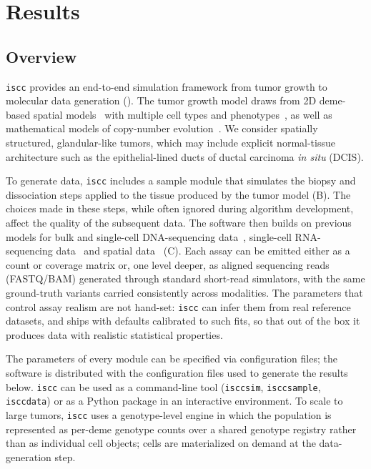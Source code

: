 \documentclass{article}
\begin{document}
\section{Results}
\label{sec:results}

\subsection{Overview}
\label{sec:overview}
\texttt{iscc} provides an end-to-end simulation framework from tumor growth to molecular data
generation (). The tumor growth model draws from 2D deme-based spatial
models~\cite{noble_spatial_2022} with multiple cell types and phenotypes~\cite{gatenbee_macrophage-mediated_2019},
as well as mathematical models of copy-number evolution~\cite{dinh_cinner_2025}. We consider
spatially structured, glandular-like tumors, which may include explicit normal-tissue
architecture such as the epithelial-lined ducts of ductal carcinoma \textit{in situ} (DCIS).

To generate data, \texttt{iscc} includes a sample module that simulates the biopsy and
dissociation steps applied to the tissue produced by the tumor model (B).
The choices made in these steps, while often ignored during algorithm development, affect the
quality of the subsequent data. The software then builds on previous models for bulk and
single-cell DNA-sequencing data~\cite{valecha_somatic_2022, posada_cellcoal_2020}, single-cell
RNA-sequencing data~\cite{zappia_splatter_2017, sun_scdesign2_2021} and spatial
data~\cite{zhu_srtsim_2023, andersson_almaangrowmeatissue_2024} (C). Each
assay can be emitted either as a count or coverage matrix or, one level deeper, as aligned
sequencing reads (FASTQ/BAM) generated through standard short-read simulators, with the same
ground-truth variants carried consistently across modalities. The parameters that control assay
realism are not hand-set: \texttt{iscc} can infer them from real reference datasets, and ships
with defaults calibrated to such fits, so that out of the box it produces data with realistic
statistical properties.

The parameters of every module can be specified via configuration files; the software is
distributed with the configuration files used to generate the results below. \texttt{iscc} can
be used as a command-line tool (\texttt{isccsim}, \texttt{isccsample}, \texttt{isccdata}) or as
a Python package in an interactive environment. To scale to large tumors, \texttt{iscc} uses a
genotype-level engine in which the population is represented as per-deme genotype counts over a
shared genotype registry rather than as individual cell objects; cells are materialized on
demand at the data-generation step.
\end{document}
